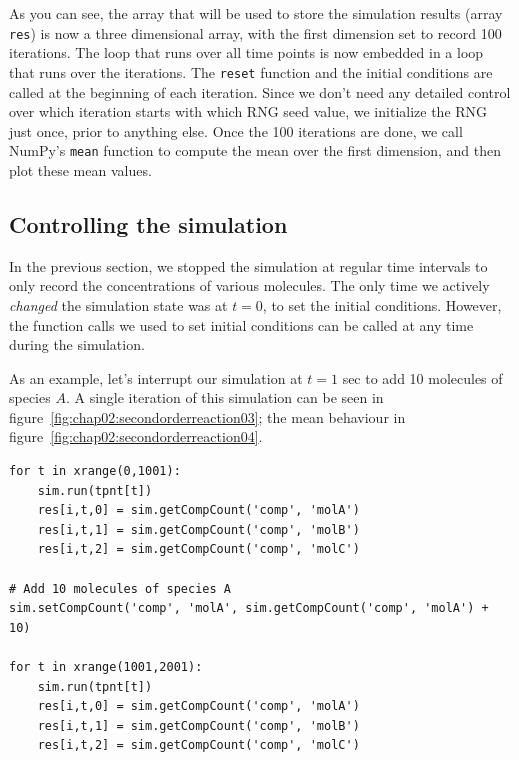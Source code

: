 \documentclass[a4paper,12pt]{book}
\begin{document}
As you can see, the array that will be used to store the simulation results (array \texttt{res}) is now a three dimensional array, with the first dimension set to record 100 iterations. The loop that runs over all time points is now embedded in a loop that runs over the iterations. The \texttt{reset} function and the initial conditions are called at the beginning of each iteration. Since we don't need any detailed control over which iteration starts with which RNG seed value, we initialize the RNG just once, prior to anything else. Once the 100 iterations are done, we call NumPy's \texttt{mean} function to compute the mean over the first dimension, and then plot these mean values. 

\subsection{Controlling the simulation}

In the previous section, we stopped the simulation at regular time intervals to only record the concentrations of various molecules. The only time we actively \emph{changed} the simulation state was at $t=0$, to set the initial conditions. However, the function calls we used to set initial conditions can be called at any time during the simulation. 

As an example, let's interrupt our simulation at $t=1$ sec to add 10 molecules of species $A$. A single iteration of this simulation can be seen in figure~\ref{fig:chap02:secondorderreaction03}; the mean behaviour in figure~\ref{fig:chap02:secondorderreaction04}. 

\begin{verbatim}
for t in xrange(0,1001):
    sim.run(tpnt[t])
    res[i,t,0] = sim.getCompCount('comp', 'molA')
    res[i,t,1] = sim.getCompCount('comp', 'molB')
    res[i,t,2] = sim.getCompCount('comp', 'molC')
    
# Add 10 molecules of species A
sim.setCompCount('comp', 'molA', sim.getCompCount('comp', 'molA') + 10)

for t in xrange(1001,2001):
    sim.run(tpnt[t])
    res[i,t,0] = sim.getCompCount('comp', 'molA')
    res[i,t,1] = sim.getCompCount('comp', 'molB')
    res[i,t,2] = sim.getCompCount('comp', 'molC')
\end{verbatim}
\end{document}

